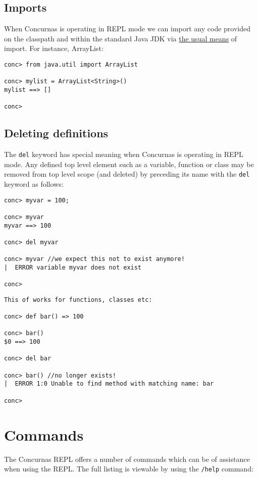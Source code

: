 \documentclass[conc-doc]{subfiles}
\begin{document}
\subsection{Imports}
When Concurnas is operating in REPL mode we can import any code provided on the classpath and within the standard Java JDK via \hyperref[chap:imports]{the usual means} of import. For instance, ArrayList:

\begin{lstlisting}[language=None]
conc> from java.util import ArrayList

conc> mylist = ArrayList<String>()
mylist ==> []

conc>
\end{lstlisting}

\subsection{Deleting definitions}
The \lstinline[language=None]{del} keyword has special meaning when Concurnas is operating in REPL mode. Any defined top level element such as a variable, function or class may be removed from top level scope (and deleted) by preceding its name with the \lstinline[language=None]{del} keyword as follows:

\begin{lstlisting}[language=None]
conc> myvar = 100;

conc> myvar
myvar ==> 100

conc> del myvar

conc> myvar //we expect this not to exist anymore!
|  ERROR variable myvar does not exist

conc>
\end{lstlisting}

\begin{lstlisting}[language=None]
This of works for functions, classes etc:

conc> def bar() => 100

conc> bar()
$0 ==> 100

conc> del bar

conc> bar() //no longer exists!
|  ERROR 1:0 Unable to find method with matching name: bar

conc> 
\end{lstlisting}

\section{Commands}
The Concurnas REPL offers a number of commands which can be of assistance when using the REPL. The full listing is viewable by using the \lstinline[language=None]{/help} command:
\end{document}
